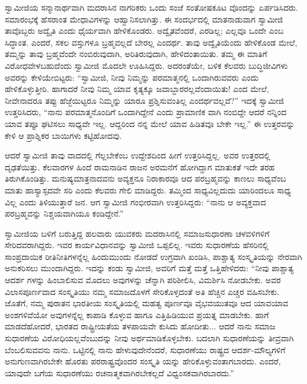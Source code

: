 ಸ್ವಾಮೀಜಿಯ ಸನ್ಮಾನಾರ್ಥವಾಗಿ ಮದರಾಸಿನ ನಾಗರಿಕರು ಒಂದು ಸಂಜೆ ಸಂತೋಷಕೂಟ ವೊಂದನ್ನು ಏರ್ಪಡಿಸಿದರು. ಸಮಾರಂಭಕ್ಕೆ ಹೆಸರಾಂತ ಮೇಧಾವಿಗಳನ್ನು ಆಹ್ವಾನಿಸಲಾಗಿತ್ತು. ಈ ಸಂದರ್ಭದಲ್ಲಿ ಮಾತನಾಡುವಾಗ ಸ್ವಾಮೀಜಿ ತಾವೊಬ್ಬರು ಅದ್ವೈತಿ ಎಂದು ಧೈರ್ಯವಾಗಿ ಹೇಳಿಕೊಂಡರು. ಅದ್ವೈತವೆಂದರೆ, ಎರಡಿಲ್ಲ; ಎಲ್ಲವೂ ಒಂದೇ ಎಂಬ ಸಿದ್ಧಾಂತ. ಎಂದರೆ, ಸಕಲ ವಸ್ತುಗಳೂ ಬ್ರಹ್ಮವಲ್ಲದೆ ಬೇರಲ್ಲ ಎಂದರ್ಥ. ತಾವು ಅದ್ವೈತಿಯೆಂದು ಹೇಳಿಕೊಂಡ ಮೇಲೆ, ತಮ್ಮನ್ನು ತಾವು ಬ್ರಹ್ಮವೆಂದೇ ನಂಬಿರುವುದಾಗಿ, ಅರಿತಿರುವುದಾಗಿ, ಹೇಳಿದಂತಾಯಿತು. ತಮ್ಮ ಈ ಮಾತಿಗೆ ವಿರೋಧವೇಳಬಹುದೆಂದು ಸ್ವಾಮೀಜಿ ಮೊದಲೇ ಊಹಿಸಿದ್ದರು. ಅದರಂತೆಯೇ, ಬಳಿಕ ಕೆಲವರು ಬುದ್ಧಿಜೀವಿಗಳು ಅವರನ್ನು ಕೇಳಿಯೇಬಿಟ್ಟರು: “ಸ್ವಾಮೀಜಿ, ನೀವು ನಿಮ್ಮನ್ನು ಪರಮಾತ್ಮನಲ್ಲಿ ಒಂದಾಗಿರುವವರು ಎಂದು ಹೇಳಿಕೊಳ್ಳುತ್ತೀರಿ. ಹಾಗಾದರೆ ನೀವು ನಿಮ್ಮ ಯಾವ ಕೃತ್ಯಕ್ಕೂ ಜವಾಬ್ದಾರರಲ್ಲವೆಂದಾಯಿತು! ಎಂದ ಮೇಲೆ, ನೀವೇನಾದರೂ ತಪ್ಪು ಹೆಜ್ಜೆಯಿಟ್ಟರೂ ನಿಮ್ಮನ್ನು ಯಾರೂ ಪ್ರಶ್ನಿಸುವಂತಿಲ್ಲ ಎಂದರ್ಥವಲ್ಲವೆ?” ಇದಕ್ಕೆ ಸ್ವಾಮೀಜಿ ಉತ್ತರಿಸಿದರು, “ನಾನು ಪರಮಾತ್ಮನೊಂದಿಗೆ ಒಂದಾಗಿದ್ದೇನೆ ಎಂದು ಪ್ರಾಮಾಣಿಕ ವಾಗಿ ನಂಬಿದ್ದೇ ಆದರೆ ನನ್ನಿಂದ ಯಾವ ತಪ್ಪೂ ಘಟಿಸಲು ಸಾಧ್ಯವೇ ಇಲ್ಲ. ಆದ್ದರಿಂದ ನನ್ನ ಮೇಲೆ ಯಾವ ಹಿಡಿತವೂ ಬೇಕೇ ಇಲ್ಲ.” ಈ ಉತ್ತರವನ್ನು ಕೇಳಿ ಆ ಪ್ರಾಶ್ನಿಕರ ಬಾಯಿಗಳು ಕಟ್ಟಿಹೋದವು.

ಆದರೆ ಸ್ವಾಮೀಜಿ ತಾವು ವಾದದಲ್ಲಿ ಗೆಲ್ಲಬೇಕೆಂಬ ಉದ್ದೇಶದಿಂದ ಹೀಗೆ ಉತ್ತರಿಸಿದ್ದಲ್ಲ. ಅವರ ಉತ್ತರದಲ್ಲಿ ದೃಢತೆಯಿತ್ತು. ಕೆಲವಾರಗಳ ಹಿಂದೆ ರಾಮನಾಡಿನ ರಾಜನ ಅರಮನೆಗೆ ಹೋಗಿದ್ದಾಗ ಮಾತುಕತೆ ಇದೇ ತರಹ ತಿರುಗಿಕೊಂಡಿತ್ತು. ಮನುಷ್ಯಮಾತ್ರನಾದವನು ಅವ್ಯಕ್ತನೂ ನಿರಾಕಾರವೂ ಆದ ಪರಬ್ರಹ್ಮವನ್ನು ಕಾಣಲು ಸಾಧ್ಯವೆಂಬ ಮಾತು ಹಾಸ್ಯಾಸ್ಪದವೇ ಸರಿ ಎಂದು ಕೆಲವರು ಗೇಲಿ ಮಾಡಿದ್ದರು. ತಮ್ಮಿಂದ ಸಾಧ್ಯವಿಲ್ಲದುದು ಯಾರಿಂದಲೂ ಸಾಧ್ಯ ವಿಲ್ಲ ಎಂದು ತಿಳಿಯುತ್ತಾರೆ ಜನ. ಆಗ ಸ್ವಾಮೀಜಿ ಗಂಭೀರವಾಗಿ ಉತ್ತರಿಸಿದ್ದರು: “ನಾನು ಆ ಅವ್ಯಕ್ತವಾದ ಪರಬ್ರಹ್ಮವನ್ನು ನಿಶ್ಚಯವಾಗಿಯೂ ಕಂಡಿದ್ದೇನೆ.”

ಸ್ವಾಮೀಜಿಯ ಬಳಿಗೆ ಬರುತ್ತಿದ್ದ ಹಲವಾರು ಯುವಕರು ಮದರಾಸಿನಲ್ಲಿ ಸಮಾಜಸುಧಾರಣಾ ಚಳವಳಿಗಳಿಗೆ ಸೇರಿದವರಾಗಿದ್ದರು. ಇವರ ಕಾರ್ಯವಿಧಾನವನ್ನು ಸ್ವಾಮೀಜಿ ಒಪ್ಪಲಿಲ್ಲ. ಇವರು ಸುಧಾರಣೆಯ ಹೆಸರಿನಲ್ಲಿ ಸಾಂಪ್ರದಾಯಿಕ ರೀತಿನೀತಿಗಳನ್ನೆಲ್ಲ ಹಿಂದುಮುಂದು ನೋಡದೆ ಉಗ್ರವಾಗಿ ಖಂಡಿಸಿ, ಪಾಶ್ಚಾತ್ಯ ಸಂಸ್ಕೃತಿಯನ್ನು ನೇರವಾಗಿ ಅನುಕರಿಸಲು ಮುಂದಾಗಿದ್ದರು. ಇದನ್ನು ಕಂಡು ಸ್ವಾಮೀಜಿ, ಅವರಿಗೆ ಮತ್ತೆ ಮತ್ತೆ ಒತ್ತಿಹೇಳಿದರು: “ನೀವು ಪಾಶ್ಚಾತ್ಯ ಆದರ್ಶ ಗಳನ್ನು ಹಿಂಬಾಲಿಸುವ ಮೊದಲು ಅವುಗಳನ್ನು ಚೆನ್ನಾಗಿ ಪರಿಶೀಲಿಸಿ, ವಿಮರ್ಶಿಸಿ ನೋಡಬೇಕು. ಅವರ ವಿಲಾಸಪೂರ್ಣವಾದ ಸಂಸ್ಕೃತಿಯು ನಮ್ಮ ಸಮಾಜದೊಳಗೆ ಸೇರಿಕೊಳ್ಳದಂತೆ ಅತಿ ಹೆಚ್ಚಿನ ಎಚ್ಚರ ವಹಿಸಬೇಕು. ಜೊತೆಗೆ, ನಮ್ಮ ಪುರಾತನ ಭಾರತೀಯ ಸಂಸ್ಕೃತಿಯಲ್ಲಿ ಮಹತ್ವ ಪೂರ್ಣವೂ ವೈಭವಯುತವೂ ಆದ ಯಾವಯಾವ ಅಂಶಗಳಿವೆಯೋ ಅವುಗಳನ್ನೆಲ್ಲ ಕಾಪಾಡಿ ಕೊಳ್ಳುವ ಹಾಗೂ ಎತ್ತಿಹಿಡಿಯುವ ಪ್ರಯತ್ನ ಮಾಡಬೇಕು. ಹಾಗೆ ಮಾಡದೆಹೋದರೆ, ಭಾರತದ ರಾಷ್ಟ್ರೀಯತೆಯ ತಳಪಾಯವೇ ಕುಸಿದು ಹೋದೀತು... ಆದರೆ ನಾನು ಸಮಾಜ ಸುಧಾರಣೆಯ ವಿರೋಧಿಯಲ್ಲವೆಂಬುದನ್ನು ನೀವು ಅರ್ಥಮಾಡಿಕೊಳ್ಳಬೇಕು. ಬದಲಾಗಿ ಸುಧಾರಣೆಯನ್ನು ತೀವ್ರವಾಗಿ ಬೆಂಬಲಿಸುವವನು ನಾನು. ಒಟ್ಟಿನಲ್ಲಿ ನಾನು ಹೇಳುವುದೇನೆಂದರೆ, ಸುಧಾರಣೆಯು ರಾಷ್ಟ್ರದ ಆದರ್ಶ-ಮೌಲ್ಯಗಳಿಗೆ ಅನುಗುಣವಾಗಿರಬೇಕೇ ಹೊರತು ಪರರಾಷ್ಟ್ರವೊಂದರ ಸಂಸ್ಕೃತಿ ಯನ್ನು ಹೇರಿಕೊಳ್ಳುವಂತಾಗಬಾರದು. ಎಂದರೆ, ಯಾವುದೇ ಬಗೆಯ ಸುಧಾರಣೆಯು ರಚನಾತ್ಮಕವಾಗಿರಬೇಕಲ್ಲದೆ ವಿಧ್ವಂಸಕವಾಗಿರಬಾರದು.”

